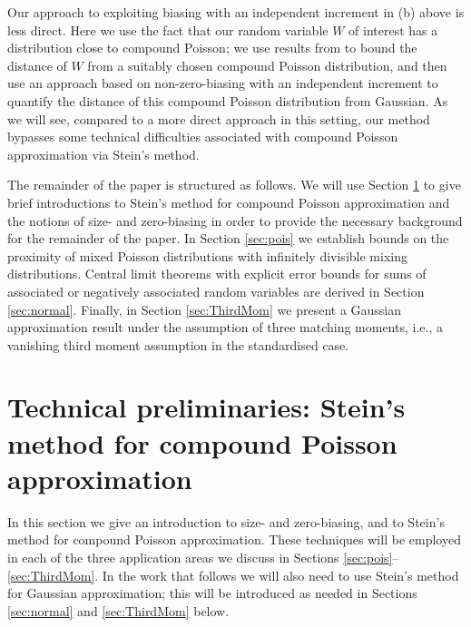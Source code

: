 \documentclass[12pt]{article}
\begin{document}
Our approach to exploiting biasing with an independent increment in (b) above is less direct. Here we use the fact that our random variable $W$ of interest has a distribution close to compound Poisson; we use results from \cite{daly13} to bound the distance of $W$ from a suitably chosen compound Poisson distribution, and then use an approach based on non-zero-biasing with an independent increment to quantify the distance of this compound Poisson distribution from Gaussian. As we will see, compared to a more direct approach in this setting, our method bypasses some technical difficulties associated with compound Poisson approximation via Stein's method.

The remainder of the paper is structured as follows. We will use Section \ref{sec:cp} to give brief introductions to Stein's method for compound Poisson approximation and the notions of size- and zero-biasing in order to provide the necessary background for the remainder of the paper. In Section \ref{sec:pois} we establish bounds on the proximity of mixed Poisson distributions with infinitely divisible mixing distributions. Central limit theorems with explicit error bounds for sums of associated or negatively associated random variables are derived in Section \ref{sec:normal}. Finally, in Section \ref{sec:ThirdMom} we present a Gaussian approximation result under the assumption of three matching moments, i.e., a vanishing third moment assumption in the standardised case.

\section{Technical preliminaries: Stein's method for compound Poisson approximation}\label{sec:cp}

In this section we give an introduction to size- and zero-biasing, and to Stein's method for compound Poisson approximation. These techniques will be employed in each of the three application areas we discuss in Sections \ref{sec:pois}--\ref{sec:ThirdMom}. In the work that follows we will also need to use Stein's method for Gaussian approximation; this will be introduced as needed in Sections \ref{sec:normal} and \ref{sec:ThirdMom} below.
\end{document}
